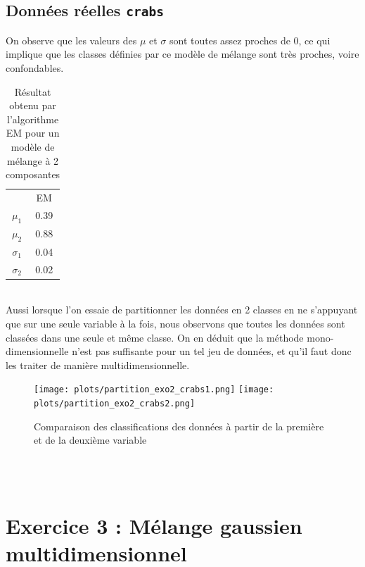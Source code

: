 \documentclass[a4paper, 10pt]{article}
\begin{document}
\subsection*{Données réelles \texttt{crabs}}
On observe que les valeurs des $\mu$ et $\sigma$ sont toutes assez proches de 0,
ce qui implique que les classes définies par ce modèle de mélange sont très proches, voire confondables.\\
\begin{table}[h]
\centering
	\begin{tabular}{cc}
		  & EM \\
		$\mu_{1}$ & 0.39 \\
		$\mu_{2}$ & 0.88\\
		$\sigma_{1}$ & 0.04 \\
		$\sigma_{2}$ & 0.02  \\
	\end{tabular}
  \caption{Résultat obtenu par l'algorithme EM  pour un modèle de mélange à 2 composantes}
\end{table}\\
Aussi lorsque l’on essaie de partitionner les données en 2 classes en ne s’appuyant que sur une
seule variable à la fois, nous observons que toutes les données sont classées dans une seule et même classe.
On en déduit que la méthode mono-dimensionnelle n’est pas suffisante pour un tel jeu de
données, et qu’il faut donc les traiter de manière multidimensionnelle.\\
\begin{figure}[h!]
\centering
	\texttt{[image: plots/partition\_exo2\_crabs1.png]}
	\texttt{[image: plots/partition\_exo2\_crabs2.png]}
  \caption{Comparaison des classifications des données à partir de la première et de la deuxième variable}
\end{figure}\\ \\

\section*{Exercice 3 : Mélange gaussien multidimensionnel}
\end{document}
